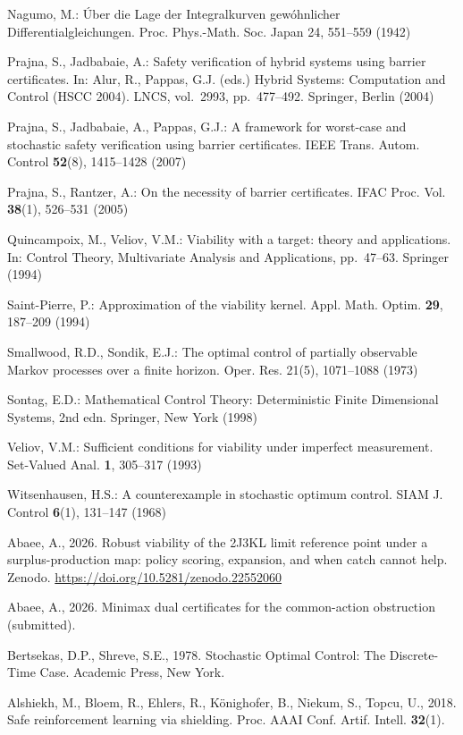 \documentclass[10pt,twocolumn]{article}
\theoremstyle{definition}
\begin{document}
{Nagumo, M.: \'Uber die Lage der Integralkurven gew\'ohnlicher
Differentialgleichungen. Proc. Phys.-Math. Soc. Japan 24, 551--559
(1942)

Prajna, S., Jadbabaie, A.: Safety verification of hybrid systems using
barrier certificates. In: Alur, R., Pappas, G.J. (eds.) Hybrid Systems:
Computation and Control (HSCC 2004). LNCS, vol.~2993, pp.~477--492.
Springer, Berlin (2004)

Prajna, S., Jadbabaie, A., Pappas, G.J.: A framework for worst-case and
stochastic safety verification using barrier certificates. IEEE Trans.
Autom. Control \textbf{52}(8), 1415--1428 (2007)

Prajna, S., Rantzer, A.: On the necessity of barrier certificates. IFAC
Proc. Vol. \textbf{38}(1), 526--531 (2005)

Quincampoix, M., Veliov, V.M.: Viability with a target: theory and
applications. In: Control Theory, Multivariate Analysis and
Applications, pp.~47--63. Springer (1994)

Saint-Pierre, P.: Approximation of the viability kernel. Appl. Math.
Optim. \textbf{29}, 187--209 (1994)

Smallwood, R.D., Sondik, E.J.: The optimal control of partially
observable Markov processes over a finite horizon. Oper. Res. 21(5),
1071--1088 (1973)

Sontag, E.D.: Mathematical Control Theory: Deterministic Finite Dimensional Systems, 2nd edn. Springer, New York (1998)

Veliov, V.M.: Sufficient conditions for viability under imperfect
measurement. Set-Valued Anal. \textbf{1}, 305--317 (1993)

Witsenhausen, H.S.: A counterexample in stochastic optimum control.
SIAM J. Control \textbf{6}(1), 131--147 (1968)

Abaee, A., 2026. Robust viability of the 2J3KL limit reference point
under a surplus-production map: policy scoring, expansion, and when
catch cannot help. Zenodo.
\url{https://doi.org/10.5281/zenodo.22552060}

Abaee, A., 2026. Minimax dual certificates for the common-action
obstruction (submitted).

Bertsekas, D.P., Shreve, S.E., 1978. Stochastic Optimal Control: The
Discrete-Time Case. Academic Press, New York.

Alshiekh, M., Bloem, R., Ehlers, R., K\"{o}nighofer, B., Niekum, S.,
Topcu, U., 2018. Safe reinforcement learning via shielding. Proc. AAAI
Conf. Artif. Intell. \textbf{32}(1).

}
\end{document}
